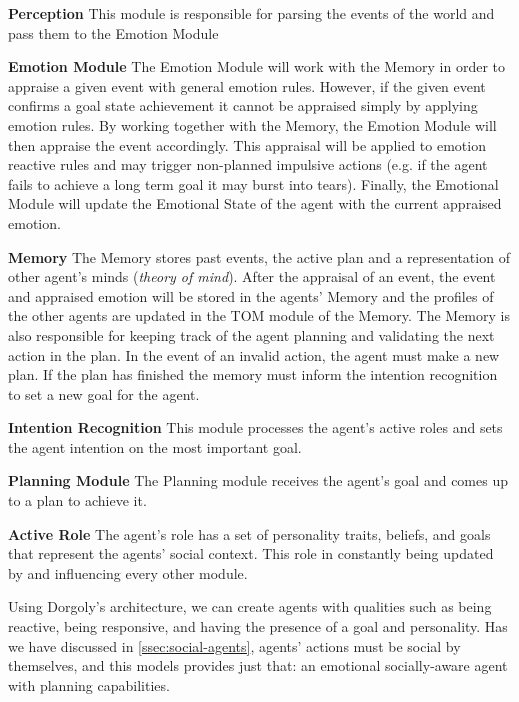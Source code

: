 \begin{description}
\item \textbf{Perception} This module is responsible for parsing the events of the world and pass them to the Emotion Module
\item \textbf{Emotion Module} The Emotion Module will work with the Memory in order to appraise a given event with general emotion rules.
However, if the given event confirms a goal state achievement it cannot be appraised simply by applying emotion rules.
By working together with the Memory, the Emotion Module will then appraise the event accordingly.
This appraisal will be applied to emotion reactive rules and may trigger non-planned impulsive actions (e.g. if the agent fails to achieve a long term goal it may burst into tears).
Finally, the Emotional Module will update the Emotional State of the agent with the current appraised emotion.
\item \textbf{Memory} The Memory stores past events, the active plan and a representation of other agent's minds (\textit{theory of mind}).
After the appraisal of an event, the event and appraised emotion will be stored in the agents' Memory and the profiles of the other agents are updated in the TOM module of the Memory.
The Memory is also responsible for keeping track of the agent planning and validating the next action in the plan.
In the event of an invalid action, the agent must make a new plan.
If the plan has finished the memory must inform the intention recognition to set a new goal for the agent.
\item \textbf{Intention Recognition} This module processes the agent's active roles and sets the agent intention on the most important goal.
\item \textbf{Planning Module} The Planning module receives the agent's goal and comes up to a plan to achieve it.
\item \textbf{Active Role} The agent's role has a set of personality traits, beliefs, and goals that represent the agents' social context.
This role in constantly being updated by and influencing every other module. 
\end{description}

Using Dorgoly's architecture, we can create agents with qualities such as being reactive, being responsive, and having the presence of a goal and personality.
Has we have discussed in \ref{ssec:social-agents}, agents' actions must be social by themselves, and this models provides just that: an emotional socially-aware agent with planning capabilities.
